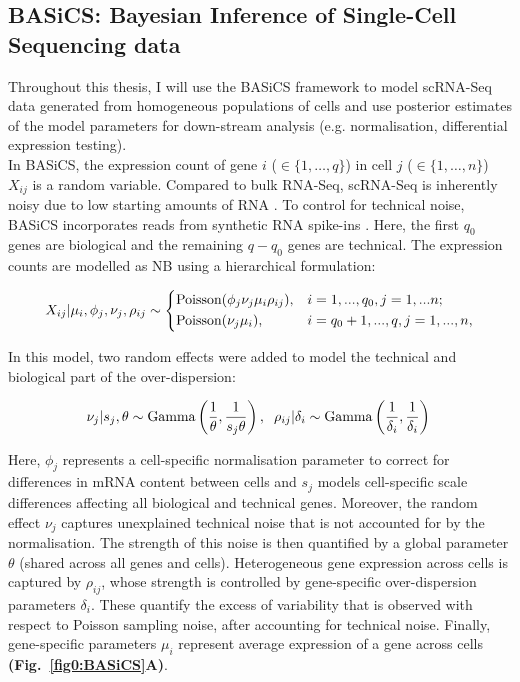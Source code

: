 \newpage

\subsection{BASiCS: Bayesian Inference of Single-Cell Sequencing data} 
\label{sec0:BASiCS}

Throughout this thesis, I will use the \gls{BASiCS} framework \citep{Vallejos2015BASiCS, Vallejos2016} to model scRNA-Seq data generated from homogeneous populations of cells and use posterior estimates of the model parameters for down-stream analysis (e.g. normalisation, differential expression testing).\\

In BASiCS, the expression count of gene $i$ ($ \in \{1, \ldots, q\}$) in cell $j$ ($\in \{ 1, \ldots ,n\}$) $X_{ij}$ is a random variable. Compared to bulk RNA-Seq, scRNA-Seq is inherently noisy due to low starting amounts of RNA \citep{Brennecke2013}. To control for technical noise, BASiCS incorporates reads from synthetic RNA spike-ins \citep{Jiang2011}. Here, the first $q_0$ genes are biological and the  remaining $q-q_0$ genes are technical. The expression counts are modelled as NB using a hierarchical formulation:

\begin{equation} 
 X_{ij}|\mu_i,\phi_j,\nu_j,\rho_{ij} \sim
 \left\lbrace
  \begin{aligned}
    &\textnormal{Poisson}(\phi_j\nu_j\mu_i\rho_{ij}), && i=1,...,q_0,j=1,...n;  \\ 
    &\textnormal{Poisson}(\nu_j\mu_i), && i=q_0+1,...,q,j=1,...,n,    	    
  \end{aligned}
\right.
\end{equation} 

In this model, two random effects were added to model the technical and biological part of the over-dispersion:

\begin{equation} 
\nu_j|s_j,\theta \sim \textnormal{Gamma}\left(\frac{1}{\theta},\frac{1}{s_j\theta}\right), \hspace{0.2cm} \rho_{ij}|\delta_i  \sim \textnormal{Gamma}\left(\frac{1}{\delta_i},\frac{1}{\delta_i}\right)\\
\end{equation} 

Here, $\phi_j$ represents a cell-specific normalisation parameter to correct for differences in mRNA content between cells and $s_j$ models cell-specific scale differences affecting all biological and technical genes. Moreover, the random effect $\nu_j$ captures unexplained technical noise that is not accounted for by the normalisation. The strength of this noise is then quantified by a global parameter $\theta$ (shared across all genes and cells). Heterogeneous gene expression across cells is captured by $\rho_{ij}$, whose strength is controlled by gene-specific over-dispersion parameters $\delta_i$. These quantify the excess of variability that is observed with respect to Poisson sampling noise, after accounting for technical noise. Finally, gene-specific parameters $\mu_i$ represent average expression of a gene across cells \textbf{(Fig.~\ref{fig0:BASiCS}A)}. 

